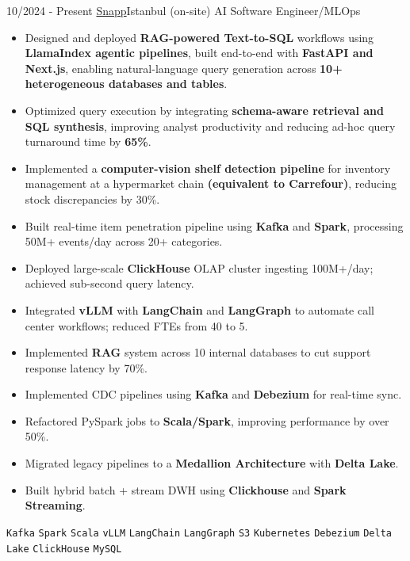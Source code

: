 \documentclass[9pt]{developercv} %
\begin{document}
\vspace{-5pt}
\begin{entrylist}
  \entry
    {10/2024 - Present}
    {\href{https://snapp.ir}{Snapp}\newline\small\textnormal{Istanbul (on-site)}}
    {AI Software Engineer/MLOps}
    {\vspace{-6pt}
    \begin{itemize}[itemsep=3pt,topsep=2pt,parsep=0pt,partopsep=0pt, leftmargin=-1pt]
        \item{Designed and deployed \textbf{RAG-powered Text-to-SQL} workflows using \textbf{LlamaIndex agentic pipelines}, built end-to-end with \textbf{FastAPI and Next.js}, enabling natural-language query generation across \textbf{10+ heterogeneous databases and tables}.}
        \item{Optimized query execution by integrating \textbf{schema-aware retrieval and SQL synthesis}, improving analyst productivity and reducing ad-hoc query turnaround time by \textbf{65\%}.}
        \item{Implemented a \textbf{computer-vision shelf detection pipeline} for inventory management at a hypermarket chain \textbf{(equivalent to Carrefour)}, reducing stock discrepancies by 30\%.}
        \item{Built real-time item penetration pipeline using \textbf{Kafka} and \textbf{Spark}, processing 50M+ events/day across 20+ categories.}
        \item{Deployed large-scale \textbf{ClickHouse} OLAP cluster ingesting 100M+/day; achieved sub-second query latency.}
        \item{Integrated \textbf{vLLM} with \textbf{LangChain} and \textbf{LangGraph} to automate call center workflows; reduced FTEs from 40 to 5.}
        \item{Implemented \textbf{RAG} system across 10 internal databases to cut support response latency by 70\%.}
        \item{Implemented CDC pipelines using \textbf{Kafka} and \textbf{Debezium} for real-time sync.}
        \item{Refactored PySpark jobs to \textbf{Scala/Spark}, improving performance by over 50\%.}
        \item{Migrated legacy pipelines to a \textbf{Medallion Architecture} with \textbf{Delta Lake}.}
        \item{Built hybrid batch + stream DWH using \textbf{Clickhouse} and \textbf{Spark Streaming}.}
    \end{itemize}
    \vspace{2pt}
    \texttt{Kafka} \slashsep \texttt{Spark} \slashsep \texttt{Scala} \slashsep \texttt{vLLM} \slashsep \texttt{LangChain} \slashsep \texttt{LangGraph} \slashsep \texttt{S3} \slashsep \texttt{Kubernetes} \slashsep \texttt{Debezium} \slashsep \texttt{Delta Lake} \slashsep \texttt{ClickHouse} \slashsep \texttt{MySQL}
    }
\end{entrylist}
\end{document}
